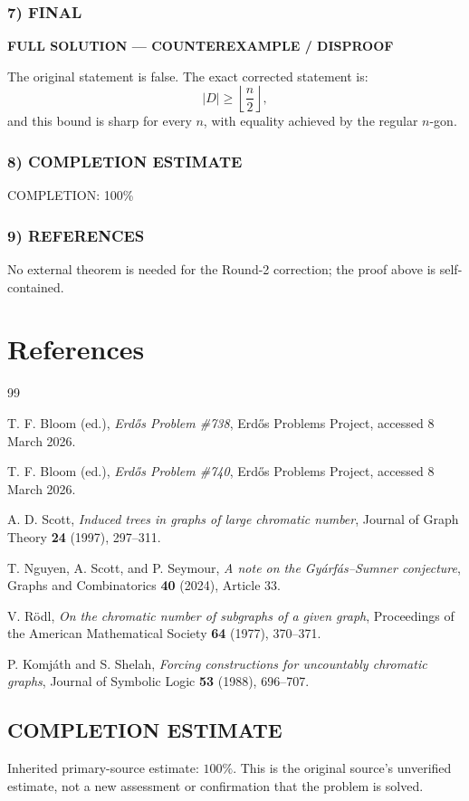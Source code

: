 \subsubsection*{7) FINAL}
\textbf{FULL SOLUTION --- COUNTEREXAMPLE / DISPROOF}

The original statement is false. The exact corrected statement is:
\[
|D|\ge \left\lfloor\frac n2\right\rfloor,
\]
and this bound is sharp for every $n$, with equality achieved by the regular $n$-gon.

\subsubsection*{8) COMPLETION ESTIMATE}
COMPLETION: 100\%

\subsubsection*{9) REFERENCES}
No external theorem is needed for the Round-2 correction; the proof above is self-contained.


\section{References}
\begin{thebibliography}{99}

T. F. Bloom (ed.), \emph{Erd\H{o}s Problem \#738}, Erd\H{o}s Problems Project, accessed 8 March 2026.

T. F. Bloom (ed.), \emph{Erd\H{o}s Problem \#740}, Erd\H{o}s Problems Project, accessed 8 March 2026.

A. D. Scott, \emph{Induced trees in graphs of large chromatic number}, Journal of Graph Theory \textbf{24} (1997), 297--311.

T. Nguyen, A. Scott, and P. Seymour, \emph{A note on the Gy\'{a}rf\'{a}s--Sumner conjecture}, Graphs and Combinatorics \textbf{40} (2024), Article 33.

V. R\"{o}dl, \emph{On the chromatic number of subgraphs of a given graph}, Proceedings of the American Mathematical Society \textbf{64} (1977), 370--371.

P. Komj\'{a}th and S. Shelah, \emph{Forcing constructions for uncountably chromatic graphs}, Journal of Symbolic Logic \textbf{53} (1988), 696--707.

\end{thebibliography}


\subsection*{COMPLETION ESTIMATE}
Inherited primary-source estimate: $100\%$. This is the original source's unverified estimate, not a new assessment or confirmation that the problem is solved.
